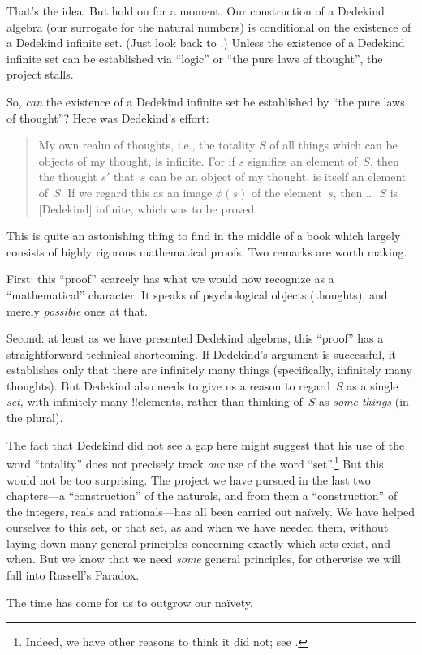 \documentclass[../../../include/open-logic-section]{subfiles}
\begin{document}
That's the idea. But hold on for a moment. Our construction of a
Dedekind algebra (our surrogate for the natural numbers) is
conditional on the existence of a Dedekind infinite set. (Just look
back to .)
Unless the existence of a Dedekind infinite set can be established via
``logic'' or ``the pure laws of thought'', the project stalls. 

So, \emph{can} the existence of a Dedekind infinite set be established
by ``the pure laws of thought''? Here was Dedekind's effort:
\begin{quote}
  My own realm of thoughts, i.e., the totality $S$ of all things which
  can be objects of my thought, is infinite. For if $s$ signifies an
  element of~$S$, then the thought $s'$ that~$s$ can be an object of
  my thought, is itself an element of~$S$. If we regard this as an
  image $\phi(s)$ of the element~$s$, then \dots~$S$ is [Dedekind]
  infinite, which was to be proved.
	\cite[\S66]{Dedekind1888}
\end{quote}
This is quite an astonishing thing to find in the middle of a book
which largely consists of highly rigorous mathematical proofs. Two
remarks are worth making. 

First: this ``proof'' scarcely has what we would now recognize as a
``mathematical'' character. It speaks of psychological objects
(thoughts), and merely \emph{possible} ones at that.

Second: at least as we have presented Dedekind algebras, this
``proof'' has a straightforward technical shortcoming. If Dedekind's
argument is successful, it establishes only that there are infinitely
many things (specifically, infinitely many thoughts). But Dedekind
also needs to give us a reason to regard~$S$ as a single \emph{set},
with infinitely many !!{element}s, rather than thinking of~$S$ as
\emph{some things} (in the plural). 

The fact that Dedekind did not see a gap here might suggest that his
use of the word ``totality'' does not precisely track \emph{our} use
of the word ``set''.\footnote{Indeed, we have other reasons to think
it did not; see \cite[p.~23]{Potter2004}.} But this would not be
too surprising. The project we have pursued in the last two
chapters---a ``construction'' of the naturals, and from them a
``construction'' of the integers, reals and rationals---has all been
carried out na\"ively. We have helped ourselves to this set, or that
set, as and when we have needed them, without laying down many general
principles concerning exactly which sets exist, and when. But we know
that we need \emph{some} general principles, for otherwise we will
fall into Russell's Paradox.

 The time has come for us to outgrow our na\"ivety. 
\end{document}
